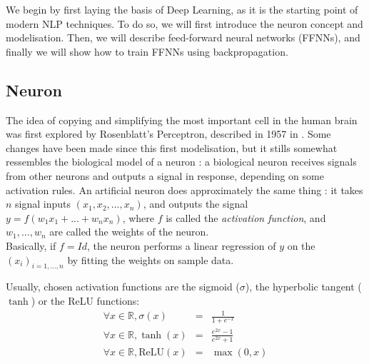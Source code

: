 \documentclass{article}
\newcommand{\R}{\mathbb R}
\begin{document}
We begin by first laying the basis of Deep Learning, as it is the starting
point of modern NLP techniques. To do so, we will first introduce 
the neuron concept and modelisation. Then, we will describe 
feed-forward neural networks (FFNNs), and finally we will show how to train
FFNNs using backpropagation. 

\subsection{Neuron}
The idea of copying and simplifying the most important cell in the human 
brain was first explored by Rosenblatt's Perceptron, described in 1957 in \cite{Perceptron}. Some changes 
have been made since this first modelisation, but it stills somewhat 
ressembles the biological model of a neuron : a biological neuron receives
signals from other neurons and outputs a signal in response, depending on some 
activation rules. 
An artificial neuron does approximately the same thing : 
it takes $n$ signal inputs $(x_1, x_2, ..., x_n)$, and outputs the signal $y = f(w_1  x_1 + ... + w_n  x_n)$, 
where $f$ is called the \textit{activation function}, and $w_1, ..., w_n$ are called the weights 
of the neuron. \\

\noindent Basically, if $f = Id$, the neuron performs a linear regression 
of $y$ on the $(x_i)_{i=1, ..., n}$ by fitting the weights on sample data. 

\noindent Usually, chosen activation functions are the sigmoid ($\sigma$), the hyperbolic tangent ($\tanh$) or the ReLU functions:
\begin{eqnarray*}
    \forall x \in \R, \sigma(x) &=& \frac{1}{1+e^{-x}} \\
    \forall x \in \R, \tanh(x) &=& \frac{e^{2x}-1}{e^{2x}+1} \\
    \forall x \in \R, \text{ReLU}(x) &=& \max(0, x) 
\end{eqnarray*}
\end{document}
